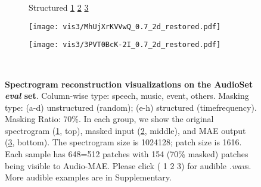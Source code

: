 \documentclass{article}
\begin{document}
\begin{figure}[h]
\begin{subfigure}[b]{0.245\linewidth}
{            Structured
            \href{https://www.dropbox.com/s/6m7amgbd58z9a9h/CWQvCCRuU6k_0.7_2d_org.mp4?dl=0}{1}
            \href{https://www.dropbox.com/s/467zm11n8a8n5jd/CWQvCCRuU6k_0.7_2d_masked.mp4?dl=0}{2}
            \href{https://www.dropbox.com/s/93yobqlo0brgol7/CWQvCCRuU6k_0.7_2d_restored.mp4?dl=0}{3}            
        }
\label{fig:vis:f}
    \end{subfigure}   
    \begin{subfigure}[b]{0.245\linewidth}
        \texttt{[image: vis3/MhUjXrKVVwQ\_0.7\_2d\_restored.pdf]}
        \vspace{-0.2em}
\label{fig:vis:g}
    \end{subfigure}
    \begin{subfigure}[b]{0.245\linewidth}
        \texttt{[image: vis3/3PVT0BcK-2I\_0.7\_2d\_restored.pdf]}
        \vspace{-0.2em}
\label{fig:vis:h}
    \end{subfigure} 
    \\
\caption{
    \textbf{Spectrogram reconstruction visualizations on the AudioSet \textit{eval} set}. 
    Column-wise type: speech, music, event, others. 
    Masking type: (a-d) unstructured (random); (e-h) structured (timefrequency).
    Masking Ratio: 70\%.
    In each group, we show the original spectrogram (\href{https://www.dropbox.com/s/2721v67ud4qxbur/DB38NRSHw9A_0.7_org.mp4?dl=0}{1}, top), masked input (\href{https://www.dropbox.com/s/g7xl0o8hczecqm2/DB38NRSHw9A_0.7_masked.mp4?dl=0}{2}, middle), and MAE output (\href{https://www.dropbox.com/s/onmdvpgykphlfx6/DB38NRSHw9A_0.7_restored.mp4?dl=0}{3}, bottom). 
    The spectrogram size is 1024128; patch size is 1616. Each sample has 648=512 patches with 154 (70\% masked) patches being visible to Audio-MAE. 
    Please click ({\color{hrefcolor} 1 2 3})
    for audible \emph{.wav}s. More audible examples are in Supplementary.
    }
    \label{fig:vis}
\end{figure}
\end{document}
